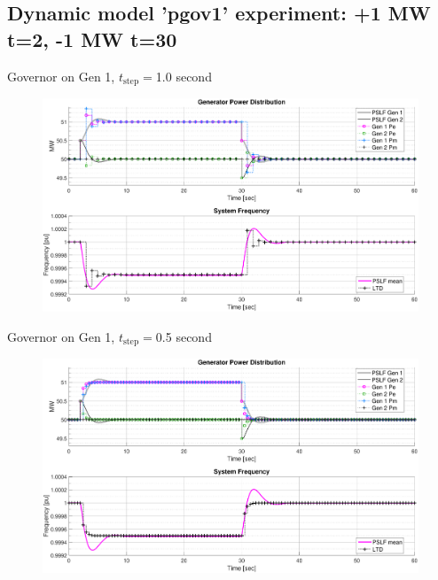 \documentclass[14pt, unknownkeysallowed]{beamer}
\begin{document}
\subsection{Dynamic model 'pgov1' experiment: +1 MW t=2, -1 MW t=30}
\begin{frame}
Governor on Gen 1, $t_\text{step}=$1.0 second
\begin{figure}
	\includegraphics[width=\linewidth]{pgov1TestA}
\end{figure}
\end{frame}
\begin{frame}
Governor on Gen 1, $t_\text{step}=$0.5 second
\begin{figure}
\includegraphics[width=\linewidth]{pgov1TestC}
\end{figure}
\end{frame}
\end{document}
